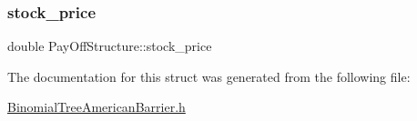 \hypertarget{structPayOffStructure_a8a98246aab62c5b12b44f883dbeb768a}{}\label{structPayOffStructure_a8a98246aab62c5b12b44f883dbeb768a} 
\subsubsection{\texorpdfstring{stock\+\_\+price}{stock\_price}}
{\footnotesize\ttfamily double Pay\+Off\+Structure\+::stock\+\_\+price}



The documentation for this struct was generated from the following file\+:\begin{DoxyCompactItemize}
\item 
\hyperlink{BinomialTreeAmericanBarrier_8h}{Binomial\+Tree\+American\+Barrier.\+h}\end{DoxyCompactItemize}
